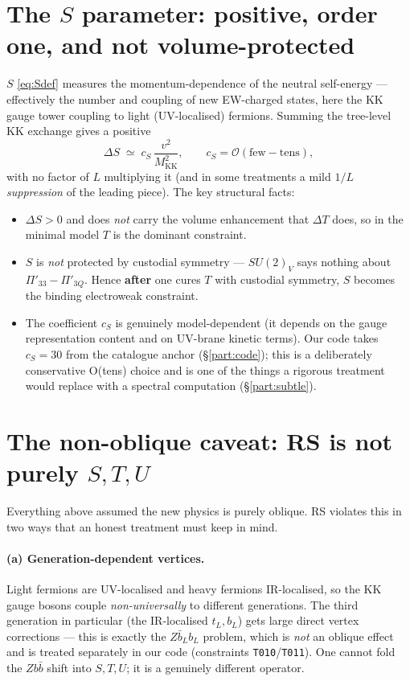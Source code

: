 \documentclass[11pt]{article}
\newcommand{\MKK}{M_{\mathrm{KK}}}
\newcommand{\Pibig}{\Pi}
\newcommand{\vev}{v}
\newcommand{\code}[1]{\texttt{#1}}
\theoremstyle{definition}
\begin{document}
\section{The $S$ parameter: positive, order one, and not volume-protected}
\label{sec:Sparam}

$S$ \eqref{eq:Sdef} measures the momentum-dependence of the neutral self-energy
--- effectively the number and coupling of new EW-charged states, here the KK
gauge tower coupling to light (UV-localised) fermions. Summing the tree-level KK
exchange gives a positive
\begin{equation}
\Delta S \;\simeq\; c_S\,\frac{\vev^2}{\MKK^2}, \qquad c_S = \mathcal{O}(\text{few}\!-\!\text{tens}),
\label{eq:Smin}
\end{equation}
with no factor of $L$ multiplying it (and in some treatments a mild $1/L$
\emph{suppression} of the leading piece). The key structural facts:
\begin{itemize}[leftmargin=1.4em]
\item $\Delta S > 0$ and does \emph{not} carry the volume enhancement that
$\Delta T$ does, so in the minimal model $T$ is the dominant constraint.
\item $S$ is \emph{not} protected by custodial symmetry --- $SU(2)_V$ says
nothing about $\Pibig'_{33}-\Pibig'_{3Q}$. Hence \textbf{after} one cures $T$
with custodial symmetry, $S$ becomes the binding electroweak constraint.
\item The coefficient $c_S$ is genuinely model-dependent (it depends on the gauge
representation content and on UV-brane kinetic terms). Our code takes
$c_S = 30$ from the catalogue anchor (\S\ref{part:code}); this is a
deliberately conservative O(tens) choice and is one of the things a rigorous
treatment would replace with a spectral computation (\S\ref{part:subtle}).
\end{itemize}

\section{The non-oblique caveat: RS is not purely $S,T,U$}
\label{sec:nonoblique}

Everything above assumed the new physics is purely oblique. RS violates this in
two ways that an honest treatment must keep in mind.

\paragraph{(a) Generation-dependent vertices.} Light fermions are UV-localised and
heavy fermions IR-localised, so the KK gauge bosons couple \emph{non-universally}
to different generations. The third generation in particular (the IR-localised
$t_L, b_L$) gets large direct vertex corrections --- this is exactly the
$Z\bar b_L b_L$ problem, which is \emph{not} an oblique effect and is treated
separately in our code (constraints \code{T010}/\code{T011}). One cannot fold the
$Zb\bar b$ shift into $S,T,U$; it is a genuinely different operator.
\end{document}
